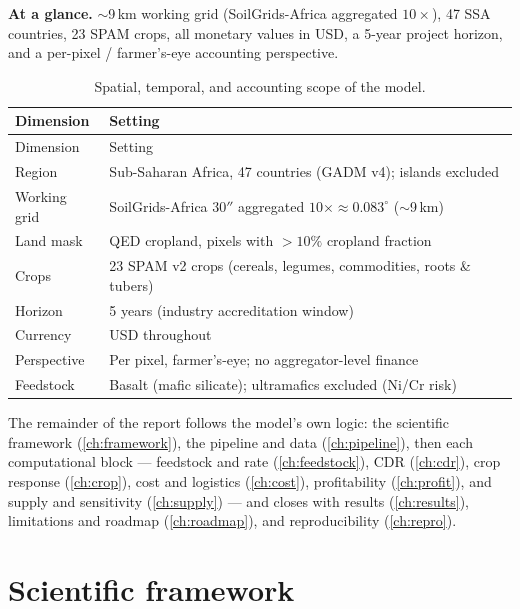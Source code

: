 \documentclass[openany]{book}
\begin{document}
\begin{keybox}
\textbf{At a glance.} $\sim$9\,km working grid (SoilGrids-Africa aggregated
$10\times$), 47 SSA countries, 23 SPAM crops, all monetary values in USD, a
5-year project horizon, and a per-pixel / farmer's-eye accounting perspective.
\end{keybox}

\begin{longtable}[]{@{}ll@{}}
\caption{Spatial, temporal, and accounting scope of the model.}\label{tbl:scope}\\
\toprule
Dimension & Setting \\
\midrule
\endfirsthead
\toprule
Dimension & Setting \\
\midrule
\endhead
Region & Sub-Saharan Africa, 47 countries (GADM v4); islands excluded \\
Working grid & SoilGrids-Africa $30''$ aggregated $10\times \approx 0.083^\circ$ ($\sim$9\,km) \\
Land mask & QED cropland, pixels with $>10\%$ cropland fraction \\
Crops & 23 SPAM v2 crops (cereals, legumes, commodities, roots \& tubers) \\
Horizon & 5 years (industry accreditation window) \\
Currency & USD throughout \\
Perspective & Per pixel, farmer's-eye; no aggregator-level finance \\
Feedstock & Basalt (mafic silicate); ultramafics excluded (Ni/Cr risk) \\
\bottomrule
\end{longtable}

The remainder of the report follows the model's own logic: the scientific
framework (\autoref{ch:framework}), the pipeline and data
(\autoref{ch:pipeline}), then each computational block --- feedstock and rate
(\autoref{ch:feedstock}), CDR (\autoref{ch:cdr}), crop response
(\autoref{ch:crop}), cost and logistics (\autoref{ch:cost}), profitability
(\autoref{ch:profit}), and supply and sensitivity (\autoref{ch:supply}) --- and
closes with results (\autoref{ch:results}), limitations and roadmap
(\autoref{ch:roadmap}), and reproducibility (\autoref{ch:repro}).

\chapter{Scientific framework}\label{ch:framework}
\end{document}
